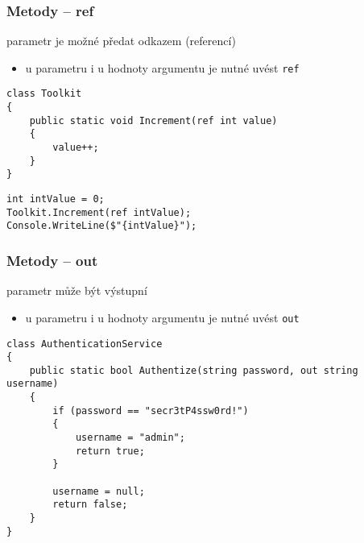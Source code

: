 \begin{frame}[fragile]
\frametitle{Metody -- ref}
\begin{bitemize}{}
\item parametr je možné předat odkazem (referencí)
\begin{itemize}
\item u parametru i u hodnoty argumentu je nutné uvést \lstinline|ref|
\end{itemize}

\end{bitemize}
\vfill
\begin{yesblock}
\begin{lstlisting}[basicstyle=\small]
class Toolkit
{
    public static void Increment(ref int value)
    {
        value++;
    }
}
\end{lstlisting}
\end{yesblock}
\vfill
\begin{yesblock}
\begin{lstlisting}[basicstyle=\small]
int intValue = 0;
Toolkit.Increment(ref intValue);
Console.WriteLine($"{intValue}");
\end{lstlisting}
\end{yesblock}
\end{frame}



\begin{frame}[fragile]
\frametitle{Metody -- out}
\begin{bitemize}{}
\item parametr může být výstupní
\begin{itemize}
\item u parametru i u hodnoty argumentu je nutné uvést \lstinline|out|
\end{itemize}

\end{bitemize}
\vfill
\begin{yesblock}
\begin{lstlisting}[basicstyle=\small]
class AuthenticationService
{
    public static bool Authentize(string password, out string username)
    {
        if (password == "secr3tP4ssw0rd!")
        {
            username = "admin";
            return true;
        }

        username = null;
        return false;
    }
}
\end{lstlisting}
\end{yesblock}
\end{frame}

